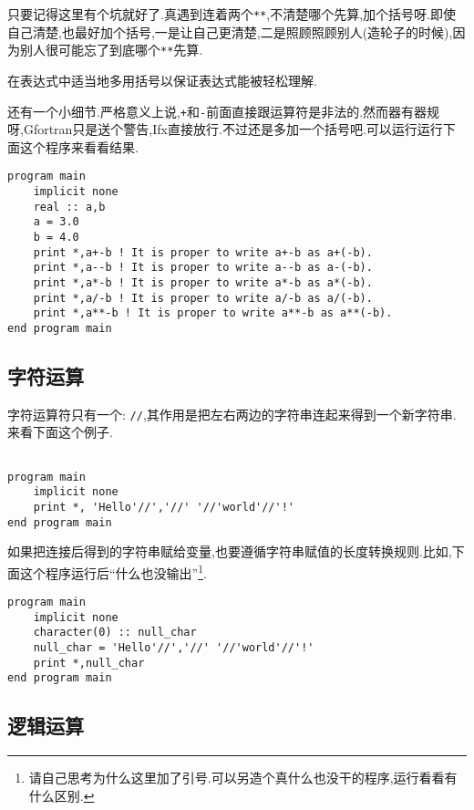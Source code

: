 只要记得这里有个坑就好了.真遇到连着两个\texttt{**},不清楚哪个先算,加个括号呀.即使自己清楚,也最好加个括号,一是让自己更清楚,二是照顾照顾别人(造轮子的时候),因为别人很可能忘了到底哪个\texttt{**}先算.

\begin{convention}\label{use_barket}
    在表达式中适当地多用括号以保证表达式能被轻松理解.
\end{convention}

还有一个小细节.严格意义上说,\texttt{+}和\texttt{-}前面直接跟运算符是非法的.然而器有器规呀,Gfortran只是送个警告,Ifx直接放行.不过还是多加一个括号吧.可以运行运行下面这个程序来看看结果.
\begin{lstlisting}
program main
    implicit none
    real :: a,b
    a = 3.0
    b = 4.0
    print *,a+-b ! It is proper to write a+-b as a+(-b).
    print *,a--b ! It is proper to write a--b as a-(-b).
    print *,a*-b ! It is proper to write a*-b as a*(-b).
    print *,a/-b ! It is proper to write a/-b as a/(-b).
    print *,a**-b ! It is proper to write a**-b as a**(-b).
end program main
\end{lstlisting}

\subsection{字符运算}\label{fortran_char_operator}

字符运算符只有一个: \texttt{//},其作用是把左右两边的字符串连起来得到一个新字符串.来看下面这个例子.
\begin{lstlisting}

program main
    implicit none
    print *, 'Hello'//','//' '//'world'//'!'
end program main
\end{lstlisting}

如果把连接后得到的字符串赋给变量,也要遵循字符串赋值的长度转换规则.比如,下面这个程序运行后``什么也没输出''\footnote{
    请自己思考为什么这里加了引号.可以另造个真什么也没干的程序,运行看看有什么区别.
}.
\begin{lstlisting}
program main
    implicit none
    character(0) :: null_char
    null_char = 'Hello'//','//' '//'world'//'!'
    print *,null_char
end program main
\end{lstlisting}

\subsection{逻辑运算}

